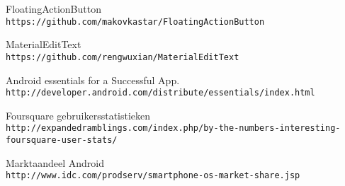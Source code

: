 \begin{thebibliography}{9}
FloatingActionButton
\\\texttt{https://github.com/makovkastar/FloatingActionButton}

MaterialEditText
\\\texttt{https://github.com/rengwuxian/MaterialEditText}

Android essentials for a Successful App.
\\\texttt{http://developer.android.com/distribute/essentials/index.html}

Foursquare gebruikersstatistieken
\\\texttt{http://expandedramblings.com/index.php/by-the-numbers-interesting-foursquare-user-stats/}

Marktaandeel Android
\\\texttt{http://www.idc.com/prodserv/smartphone-os-market-share.jsp}


\end{thebibliography}





